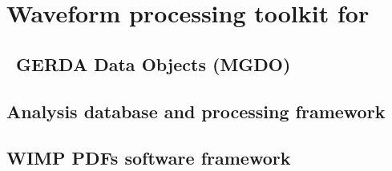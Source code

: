 
\chapter{Waveform processing toolkit for \MJ}
\label{app:MGDO}

	\section{\MJ~GERDA Data Objects (MGDO)}

    \section{Analysis database and processing framework}

    \section{WIMP PDFs software framework}
